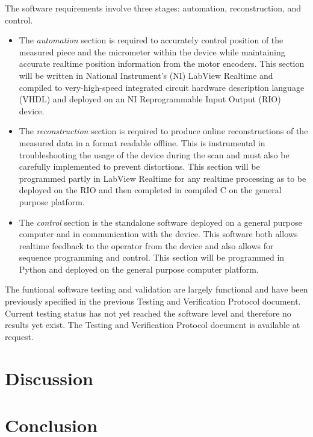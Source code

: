 \documentclass{article}
\begin{document}
The software requirements involve three stages: automation,
reconstruction, and control. 

\begin{itemize}
\item The \textit{automation} section is required to accurately
  control position of the measured piece and the micrometer within the
  device while maintaining accurate realtime position information from
  the motor encoders. This section will be written in National
  Instrument's (NI) LabView Realtime and compiled to very-high-speed
  integrated circuit hardware description language (VHDL) and deployed
  on an NI Reprogrammable Input Output (RIO) device.
\item The \textit{reconstruction} section is required to produce
  online reconstructions of the measured data in a format readable
  offline. This is instrumental in troubleshooting the usage of the
  device during the scan and must also be carefully implemented to
  prevent distortions. This section will be programmed partly in
  LabView Realtime for any realtime processing as to be deployed on
  the RIO and then completed in compiled C on the general purpose
  platform.
\item The \textit{control} section is the standalone software deployed
  on a general purpose computer and in communication with the
  device. This software both allows realtime feedback to the operator
  from the device and also allows for sequence programming and
  control. This section will be programmed in Python and deployed on
  the general purpose computer platform.
\end{itemize}

The funtional software testing and validation are largely functional
and have been previously specified in the previous Testing and
Verification Protocol document. Current testing status has not yet
reached the software level and therefore no results yet exist. The
Testing and Verification Protocol document is available at request.




\section{Discussion}
\label{sec:discussion}

\section{Conclusion}
\label{sec:conclusion}


\newpage
{}


\end{document}
